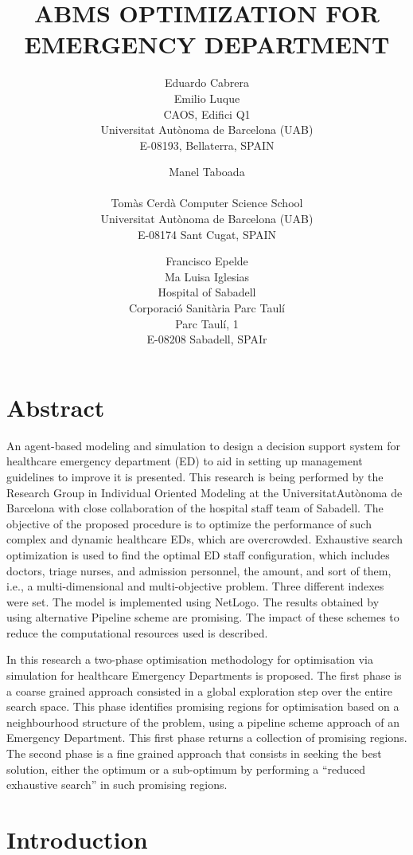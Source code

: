 \documentclass[11pt]{article} %
\title{ABMS OPTIMIZATION FOR EMERGENCY DEPARTMENT}
\author{Eduardo Cabrera\\
Emilio Luque\\ [12pt]
CAOS, Edifici Q1\\
Universitat Aut\`onoma de Barcelona (UAB)\\
E-08193, Bellaterra, SPAIN
\and
Manel Taboada \\\\[12pt]
Tom\`as Cerd\`a Computer Science School\\
Universitat Aut\`onoma de Barcelona (UAB)\\
E-08174 Sant Cugat, SPAIN
\and
Francisco Epelde \\
        Ma Luisa Iglesias \\[12pt]
        Hospital of Sabadell\\
Corporaci\'o Sanit\`aria Parc Taul\'i \\
Parc Taul\'i, 1 \\
E-08208 Sabadell, SPAIr}
\begin{document}
\maketitle

\section*{Abstract}
An agent-based modeling and simulation to design a decision support system for healthcare emergency department (ED) to aid in setting up management guidelines to improve it is presented. This research is being performed by the Research Group in Individual Oriented Modeling at the UniversitatAut\`onoma de Barcelona with close collaboration of the hospital staff team of Sabadell. The objective of the proposed  procedure is to optimize the performance of such 
complex and dynamic healthcare EDs, which are overcrowded. Exhaustive search optimization is used to find the optimal ED staff configuration, which includes doctors, triage nurses, and admission personnel, the amount, and sort of them, i.e., a multi-dimensional and multi-objective problem. Three different indexes were set. The model is implemented using NetLogo. The results obtained by using alternative Pipeline scheme are promising. The impact of these schemes to reduce the computational resources used  is described.

In this research a two-phase optimisation methodology for optimisation via simulation for healthcare Emergency Departments is proposed. The first phase is a coarse grained approach consisted in a global exploration step over the entire search space. This phase identifies promising regions for optimisation based on a neighbourhood structure of the problem, using  a pipeline scheme approach of an Emergency Department. This first phase returns a collection of promising regions. The second phase is a fine grained approach that consists in seeking the best solution, either the optimum or a sub-optimum by performing a “reduced exhaustive search” in such promising regions. 


\section{Introduction}
\label{sec:intro}
\end{document}
